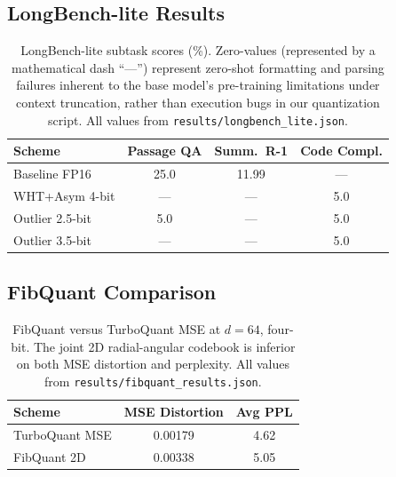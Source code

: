 \subsection{LongBench-lite Results}

\begin{table}[H]
\centering
\caption{LongBench-lite subtask scores (\%). Zero-values (represented by a mathematical dash ``---'') represent zero-shot formatting and parsing failures inherent to the base model's pre-training limitations under context truncation, rather than execution bugs in our quantization script. All values from \texttt{results/longbench\_lite.json}.}
\label{tab:longbench}
\small
\begin{tabular}{@{}lccc@{}}
\toprule
\textbf{Scheme} & \textbf{Passage QA} & \textbf{Summ.\ R-1} & \textbf{Code Compl.} \\
\midrule
Baseline FP16   & 25.0  & 11.99 & --- \\
WHT+Asym 4-bit  & ---   & ---   & 5.0 \\
Outlier 2.5-bit & 5.0   & ---   & 5.0 \\
Outlier 3.5-bit & ---   & ---   & 5.0 \\
\bottomrule
\end{tabular}
\end{table}

\subsection{FibQuant Comparison}

\begin{table}[H]
\centering
\caption{FibQuant versus TurboQuant MSE at $d = 64$, four-bit.
The joint 2D radial-angular codebook is inferior on both MSE distortion
and perplexity.
All values from \texttt{results/fibquant\_results.json}.}
\label{tab:fibquant}
\small
\begin{tabular}{@{}lcc@{}}
\toprule
\textbf{Scheme} & \textbf{MSE Distortion} & \textbf{Avg PPL} \\
\midrule
TurboQuant MSE & 0.00179 & 4.62 \\
FibQuant 2D & 0.00338 & 5.05 \\
\bottomrule
\end{tabular}
\end{table}

